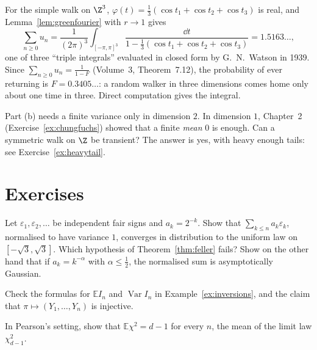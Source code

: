 \begin{remark}
For the simple walk on $\Z^3$, $\varphi(t)=\frac13(\cos t_1+\cos t_2+\cos t_3)$ is real, and Lemma~\ref{lem:greenfourier} with $r\to1$ gives
\[
\sum_{n\ge0}u_n=\frac1{(2\pi)^3}\int_{[-\pi,\pi]^3}\frac{\dd t}{1-\frac13(\cos t_1+\cos t_2+\cos t_3)}=1.5163\ldots,
\]
one of three ``triple integrals'' evaluated in closed form by G.~N.~Watson in 1939. Since $\sum_{n\ge0}u_n=\frac1{1-F}$ (Volume~3, Theorem~7.12), the
probability of ever returning is $F=0.3405\ldots$: a random walker in three dimensions comes home only about one time in three. Direct computation gives
the integral.
\end{remark}

\begin{think}
Part (b) needs a finite variance only in dimension $2$. In dimension $1$, Chapter~2 (Exercise~\ref{ex:chungfuchs}) showed that a finite \emph{mean}
$0$ is enough. Can a symmetric walk on $\Z$ be transient? The answer is yes, with heavy enough tails: see Exercise~\ref{ex:heavytail}.
\end{think}

\section{Exercises}

\begin{exercise}[$\star$]\label{ex:fellercounter}
Let $\varepsilon_1,\varepsilon_2,\dots$ be independent fair signs and $a_k=2^{-k}$. Show that $\sum_{k\le n}a_k\varepsilon_k$, normalised to have variance $1$,
converges in distribution to the uniform law on $[-\sqrt3,\sqrt3]$. Which hypothesis of Theorem~\ref{thm:feller} fails? Show on the other hand
that if $a_k=k^{-\alpha}$ with $\alpha\le\frac12$, the normalised sum is asymptotically Gaussian.
\end{exercise}

\begin{exercise}[$\star$]\label{ex:inversionsvar}
Check the formulas for $\mathbb EI_n$ and $\operatorname{Var}I_n$ in Example~\ref{ex:inversions}, and the claim that $\pi\mapsto(Y_1,\dots,Y_n)$ is injective.
\end{exercise}

\begin{exercise}[$\star$]\label{ex:chisqmean}
In Pearson's setting, show that $\mathbb E\chi^2=d-1$ for every $n$, the mean of the limit law $\chi^2_{d-1}$.
\end{exercise}

